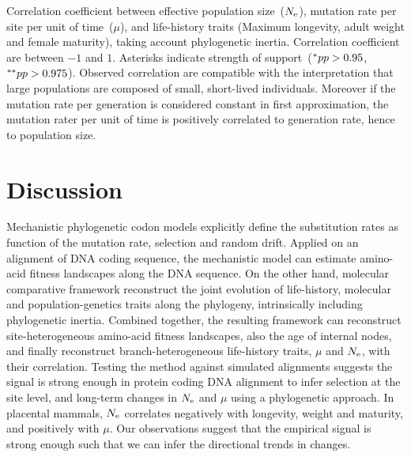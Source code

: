 \begin{table}[H]
	
	\caption[Traits correlation]{
		Correlation coefficient between effective population size~($N_{\mathrm{e}}$), mutation rate per site per unit of time~($\mu$), and life-history traits (Maximum longevity, adult weight and female maturity), taking account phylogenetic inertia.
		Correlation coefficient are between $-1$ and $1$.
		Asterisks indicate strength of support~($\smash{^{*}} pp > 0.95$, $\smash{^{**}} pp > 0.975$).
		Observed correlation are compatible with the interpretation that large populations are composed of small, short-lived individuals.
		Moreover if the mutation rate per generation is considered constant in first approximation, the mutation rater per unit of time is positively correlated to generation rate, hence to population size.
	}
	\label{fig:mammals_correlation}
\end{table}

\section{Discussion}
\label{sec:Discussion}
Mechanistic phylogenetic \gls{codon} models explicitly define the \gls{substitution} rates as function of the mutation rate, selection and random drift.
Applied on an alignment of \acrshort{DNA} coding sequence, the mechanistic model can estimate amino-acid fitness landscapes along the \acrshort{DNA} sequence.
On the other hand, molecular comparative framework reconstruct the joint evolution of life-history, molecular and population-genetics traits along the phylogeny, intrinsically including phylogenetic inertia.
Combined together, the resulting framework can reconstruct site-heterogeneous amino-acid fitness landscapes, also the age of internal nodes, and finally reconstruct branch-heterogeneous life-history traits, $\mu$ and $N_{\mathrm{e}}$, with their correlation.
Testing the method against simulated alignments suggests the signal is strong enough in protein coding \acrshort{DNA} alignment to infer selection at the site level, and long-term changes in $N_{\mathrm{e}}$ and $\mu$ using a phylogenetic approach.
In placental mammals, $N_{\mathrm{e}}$ correlates negatively with longevity, weight and maturity, and positively with $\mu$.
Our observations suggest that the empirical signal is strong enough such that we can infer the directional trends in changes.

